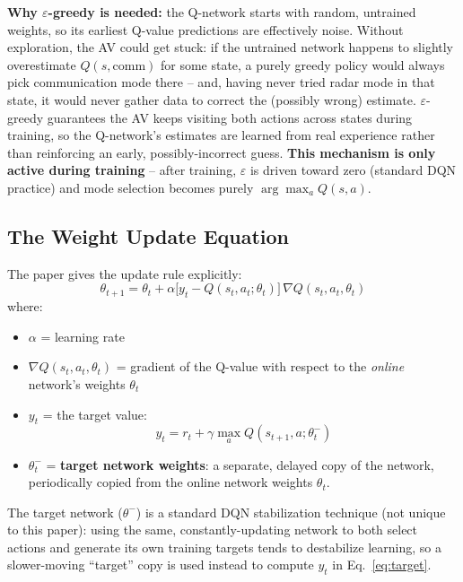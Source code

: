 \documentclass[11pt]{article}
\begin{document}
\begin{remark}
\textbf{Why $\varepsilon$-greedy is needed:} the Q-network starts with random,
untrained weights, so its earliest Q-value predictions are effectively noise. Without
exploration, the AV could get stuck: if the untrained network happens to slightly
overestimate $Q(s,\text{comm})$ for some state, a purely greedy policy would always pick
communication mode there -- and, having never tried radar mode in that state, it would
never gather data to correct the (possibly wrong) estimate. $\varepsilon$-greedy
guarantees the AV keeps visiting both actions across states during training, so the
Q-network's estimates are learned from real experience rather than reinforcing an early,
possibly-incorrect guess. \textbf{This mechanism is only active during training} --
after training, $\varepsilon$ is driven toward zero (standard DQN practice) and mode
selection becomes purely $\arg\max_a Q(s,a)$.
\end{remark}

\subsection{The Weight Update Equation}
The paper gives the update rule explicitly:
\begin{equation}
    \theta_{t+1} = \theta_t + \alpha \big[ y_t - Q(s_t,a_t;\theta_t) \big] \,
    \nabla Q(s_t,a_t,\theta_t)
    \label{eq:dqn-update}
\end{equation}
where:
\begin{itemize}[leftmargin=1.5em]
    \item $\alpha$ = learning rate
    \item $\nabla Q(s_t,a_t,\theta_t)$ = gradient of the Q-value with respect to the
    \emph{online} network's weights $\theta_t$
    \item $y_t$ = the target value:
    \begin{equation}
        y_t = r_t + \gamma \max_a Q(s_{t+1}, a; \theta_t^-)
        \label{eq:target}
    \end{equation}
    \item $\theta_t^-$ = \textbf{target network weights}: a separate, delayed copy of
    the network, periodically copied from the online network weights $\theta_t$.
\end{itemize}

\begin{remark}
The target network ($\theta^-$) is a standard DQN stabilization technique (not unique
to this paper): using the same, constantly-updating network to both select actions and
generate its own training targets tends to destabilize learning, so a slower-moving
``target'' copy is used instead to compute $y_t$ in Eq.~\eqref{eq:target}.
\end{remark}
\end{document}

